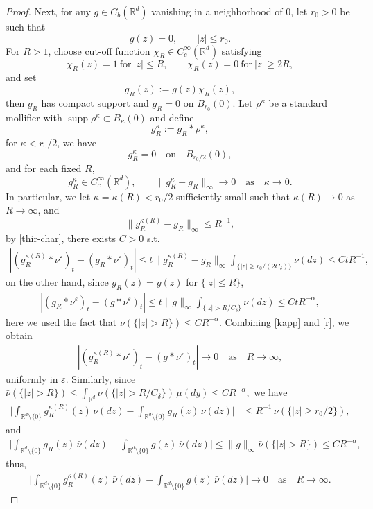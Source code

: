 \documentclass[11pt,reqno]{amsart}
\numberwithin{equation}{section}
\begin{document}
\begin{proof}
Next, for any
$g\in C_b(\mathbb R^d)$ vanishing in a neighborhood of  $0$, let
$r_0>0$ be such that
\[
g(z)=0,\qquad |z|\le r_0.
\]
For $R>1$, choose cut-off function $\chi_R\in C_c^\infty(\mathbb R^d)$ satisfying
\[
\chi_R(z)=1\ \text{for}\ |z|\le R,\qquad
\chi_R(z)=0\ \text{for}\ |z|\ge 2R,
\]
and set
\[
g_R(z):=g(z)\chi_R(z),
\]
then $g_R$ has compact support and $g_R=0$ on $B_{r_0}(0)$.
Let $\rho^\kappa$ be a standard mollifier  with
$\operatorname{supp}\rho^\kappa\subset B_\kappa(0)$ and define 
\[
g_R^\kappa:=g_R\ast\rho^\kappa, 
\]
for $\kappa<r_0/2$, we have
\[
g_R^\kappa=0\quad\text{on}\quad  B_{r_0/2}(0),
\]
and for each fixed $R$,
\[
g_R^\kappa\in C_c^\infty(\mathbb R^d),
\qquad\|g_R^\kappa-g_R\|_\infty\longrightarrow0\quad \text{as}\quad \kappa\to0.
\]
In particular, we let $\kappa=\kappa(R)<r_0/2$ sufficiently small such that  $\kappa(R)\to0 $ as $R\to \infty$, and
\[
\|g_R^{\kappa(R)}-g_R\|_\infty\le R^{-1},
\]
by \eqref{thir-char}, there exists $C>0$ s.t.
\begin{align}\label{kapp}
	\left|	(g_R^{\kappa(R)}*\nu^\varepsilon)_t	-	(g_R*\nu^\varepsilon)_t	\right|	\le t\|g_R^{\kappa(R)}-g_R\|_\infty	\int_{\{|z|\ge r_0/(2C_\delta)\}}\nu(dz)	\le C tR^{-1},
\end{align}
on the other hand, since $g_R(z)=g(z)$ for $\{|z|\le R\}$, 
\begin{align}\label{r}
	\left|	(g_R*\nu^\varepsilon)_t	-(g*\nu^\varepsilon)_t
	\right|	\le	t\|g\|_\infty\int_{\{|z|>R/C_\delta\}}\nu(dz)	\le CtR^{-\alpha},
\end{align}
here we used the fact that
$
\nu(\{|z|>R\})\le CR^{-\alpha}.
$
Combining \eqref{kapp} and \eqref{r}, we obtain
\begin{align}\label{k-a}
\left|
(g_R^{\kappa(R)}*\nu^\varepsilon)_t-(g*\nu^\varepsilon)_t
\right|\longrightarrow0\quad \text{as} \quad R\to\infty,
\end{align}
uniformly in $\varepsilon$.
Similarly, since
$
\bar\nu(\{|z|>R\})
\le\int_{\mathbb R^d}
\nu(\{|z|>R/C_\delta\})\,\mu(dy)
\le CR^{-\alpha},
$
we have
\begin{align*}%
	\bigg|	\int_{\mathbb R^d\setminus\{0\}} g_R^{\kappa(R)}(z)\,\bar\nu(dz)	-	\int_{\mathbb R^d\setminus\{0\}} g_R(z)\,\bar\nu(dz)	\bigg|	&\le
	R^{-1}\,\bar\nu(\{|z|\ge r_0/2\}),
\end{align*}
and
\begin{align*}%
	\bigg|	\int_{\mathbb R^d\setminus\{0\}} g_R(z)\,\bar\nu(dz)	-\int_{\mathbb R^d\setminus\{0\}} g(z)\,\bar\nu(dz)
	\bigg|	\le	\|g\|_\infty\bar\nu(\{|z|>R\})
	\le CR^{-\alpha},
\end{align*}
thus,
\begin{align}\label{r-r-2}
	\bigg|\int_{\mathbb R^d\setminus\{0\}}
g_R^{\kappa(R)}(z)\,\bar\nu(dz)-\int_{\mathbb R^d\setminus\{0\}}
g(z)\,\bar\nu(dz)	\bigg|
\longrightarrow 0
 \quad \text{as}\quad R\to\infty.
\end{align}


\end{proof}
\end{document}

